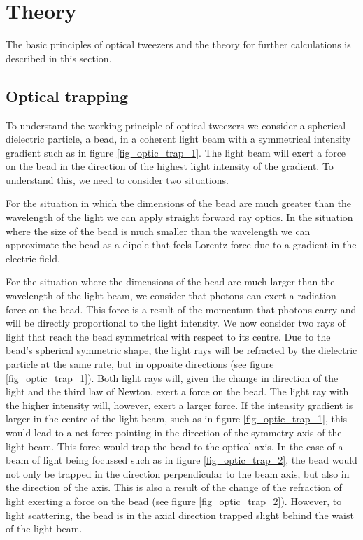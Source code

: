 \section{Theory}

The basic principles of optical tweezers and the theory for further calculations is described in this section.\\

\subsection{Optical trapping}

To understand the working principle of optical tweezers we consider a spherical dielectric particle, a bead, in a coherent light beam with a symmetrical intensity gradient such as in figure \ref{fig_optic_trap_1}. The light beam will exert a force on the bead in the direction of the highest light intensity of the gradient. To understand this, we need to consider two situations. 

For the situation in which the dimensions of the bead are much greater than the wavelength of the light we can apply straight forward ray optics. In the situation where the size of the bead is much smaller than the wavelength we can approximate the bead as a dipole that feels Lorentz force due to a gradient in the electric field.

For the situation where the dimensions of the bead are much larger than the wavelength of the light beam, we consider that photons can exert a radiation force on the bead. This force is a result of the momentum that photons carry  and will be directly proportional to the light intensity. We now consider two rays of light that reach the bead symmetrical with respect to its centre. Due to the bead's spherical symmetric shape, the light rays will be refracted by the dielectric particle at the same rate, but in opposite directions (see figure \ref{fig_optic_trap_1}). Both light rays will, given the change in direction of the light and the third law of Newton, exert a force on the bead. The light ray with the higher intensity will, however, exert a larger force. If the intensity gradient is larger in the centre of the light beam, such as in figure \ref{fig_optic_trap_1}, this would lead to a net force pointing in the direction of the symmetry axis of the light beam. This force would trap the bead to the optical axis.
In the case of a beam of light being focussed such as in figure \ref{fig_optic_trap_2}, the bead would not only be trapped in the direction perpendicular to the beam axis, but also in the direction of the axis. This is also a result of the change of the refraction of light exerting a force on the bead (see figure \ref{fig_optic_trap_2}). However, to light scattering, the bead is in the axial direction trapped slight behind the waist of the light beam.\cite{shaevitz} 


